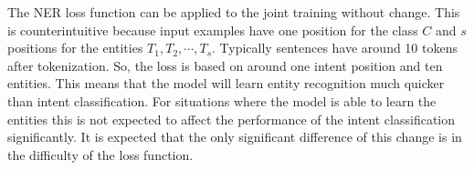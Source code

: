 The NER loss function can be applied to the joint training without change.
This is counterintuitive because input examples have one position for the class $C$ and $s$ positions for the entities $T_1, T_2, \cdots, T_s$.
Typically sentences have around 10 tokens after tokenization.
So, the loss is based on around one intent position and ten entities.
This means that the model will learn entity recognition much quicker than intent classification.
For situations where the model is able to learn the entities this is not expected to affect the performance of the intent classification significantly.
It is expected that the only significant difference of this change is in the difficulty of the loss function.
